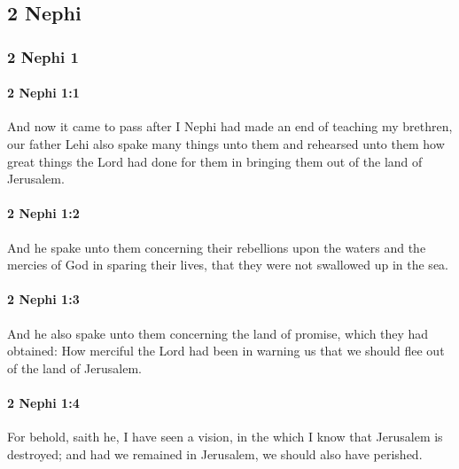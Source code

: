 \subsection{2 Nephi}
	\label{2NEPHI}
	
	\subsubsection{2 Nephi 1} %
		\label{2NEPHI-1}
		
		\paragraph{2 Nephi 1:1} %
			\label{2NEPHI-1-1}

			And now it came to pass
			after I Nephi had made an end of teaching my brethren,
			our father Lehi also spake many things unto them
			and rehearsed unto them how great things the Lord had done for them
			in bringing them out of the land of Jerusalem.

		\paragraph{2 Nephi 1:2} %
			\label{2NEPHI-1-2}

			And he spake unto them concerning their rebellions upon the waters
			and the mercies of God in sparing their lives,
			that they were not swallowed up in the sea.

		\paragraph{2 Nephi 1:3} %
			\label{2NEPHI-1-3}

			And he also spake unto them concerning the land of promise,
			which they had obtained:
			How merciful the Lord had been in warning us
			that we should flee out of the land of Jerusalem.

		\paragraph{2 Nephi 1:4} %
			\label{2NEPHI-1-4}

			For behold, saith he, I have seen a vision,
			in the which I know that Jerusalem is destroyed;
			and had we remained in Jerusalem, we should also have perished.

